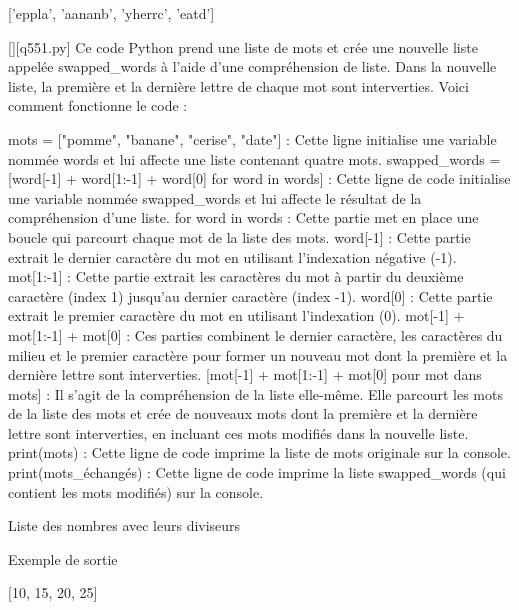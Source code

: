 ['eppla', 'aananb', 'yherrc', 'eatd']
        \par
        \begin{solution}
            \renewcommand{\nomfichier}{q551.py}
            \pythonfile{\chemincode \nomfichier}[][\nomfichier]
            Ce code Python prend une liste de mots et crée une nouvelle liste appelée swapped_words à l'aide d'une compréhension de liste. Dans la nouvelle liste, la première et la dernière lettre de chaque mot sont interverties. Voici comment fonctionne le code :

    mots = ["pomme", "banane", "cerise", "date"] : Cette ligne initialise une variable nommée words et lui affecte une liste contenant quatre mots.
    swapped_words = [word[-1] + word[1:-1] + word[0] for word in words] : Cette ligne de code initialise une variable nommée swapped_words et lui affecte le résultat de la compréhension d'une liste.
        for word in words : Cette partie met en place une boucle qui parcourt chaque mot de la liste des mots.
        word[-1] : Cette partie extrait le dernier caractère du mot en utilisant l'indexation négative (-1).
        mot[1:-1] : Cette partie extrait les caractères du mot à partir du deuxième caractère (index 1) jusqu'au dernier caractère (index -1).
        word[0] : Cette partie extrait le premier caractère du mot en utilisant l'indexation (0).
        mot[-1] + mot[1:-1] + mot[0] : Ces parties combinent le dernier caractère, les caractères du milieu et le premier caractère pour former un nouveau mot dont la première et la dernière lettre sont interverties.
        [mot[-1] + mot[1:-1] + mot[0] pour mot dans mots] : Il s'agit de la compréhension de la liste elle-même. Elle parcourt les mots de la liste des mots et crée de nouveaux mots dont la première et la dernière lettre sont interverties, en incluant ces mots modifiés dans la nouvelle liste.
    print(mots) : Cette ligne de code imprime la liste de mots originale sur la console.
    print(mots_échangés) : Cette ligne de code imprime la liste swapped_words (qui contient les mots modifiés) sur la console.
        \end{solution}
        

        \question
        Liste des nombres avec leurs diviseurs

Exemple de sortie

[10, 15, 20, 25]


